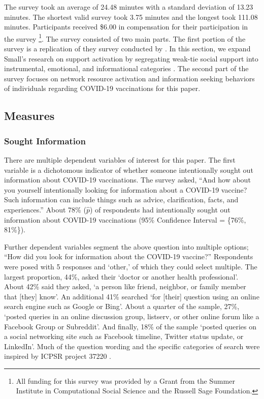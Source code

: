 The survey took an average of 24.48 minutes with a standard deviation of 13.23
minutes. The shortest valid survey took 3.75 minutes and the longest took 111.08
minutes. Participants received \$6.00 in compensation for their participation in
the survey \footnote{All funding for this survey was provided by a Grant from
the Summer Institute in Computational Social Science and the Russell Sage
Foundation.}. The survey consisted of two main parts. The first portion of the
survey is a replication of they survey conducted by
\citet{smallSomeoneTalk2017}. In this section, we expand Small's research on
support activation by segregating weak-tie social support into instrumental,
emotional, and informational categories
\citep[see][]{houseStructuresProcessesSocial1988}. The second part of the survey
focuses on network resource activation and information seeking behaviors of
individuals regarding COVID-19 vaccinations for this paper.



\hypertarget{measures}{%
\subsection{Measures}\label{measures}}

\hypertarget{sought-information}{%
\subsubsection{Sought Information}\label{sought-information}}

There are multiple dependent variables of interest for this paper. The first
variable is a dichotomous indicator of whether someone intentionally sought out
information about COVID-19 vaccinations. The survey asked, ``And how about you
yourself intentionally looking for information about a COVID-19 vaccine? Such
information can include things such as advice, clarification, facts, and
experiences.'' About 78\% (\(\widehat{p}\))
of respondents had intentionally sought out information about COVID-19
vaccinations (95\% Confidence Interval = \{76\%, 81\%\}).

Further dependent variables segment the above question into multiple options;
``How did you look for information about the COVID-19 vaccine?'' Respondents
were posed with 5 responses and `other,' of which they could select multiple.
The largest proportion, 44\%, asked their `doctor or another health
professional'. About 42\% said they asked, `a person like friend, neighbor, or
family member that [they] know'. An additional 41\% searched `for [their]
question using an online search engine such as Google or Bing'. About a quarter
of the sample, 27\%, `posted queries in an online discussion group, listserv, or
other online forum like a Facebook Group or Subreddit'. And finally, 18\% of the
sample `posted queries on a social networking site such as Facebook timeline,
Twitter status update, or LinkedIn'. Much of the question wording and the
specific categories of search were inspired by ICPSR project 37220
\citep{scanlon19}.


